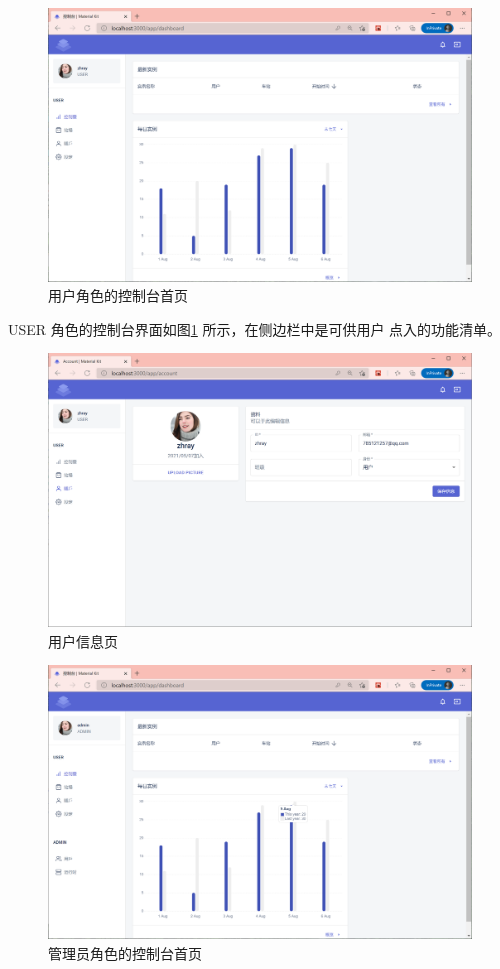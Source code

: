 \begin{figure}[htbp!]
  \centering
  \includegraphics[width=\textwidth]{figures/png/user_ui.png}
  \caption{\label{user_ui}用户角色的控制台首页}
\end{figure}

USER 角色的控制台界面如图\ref{user_ui} 所示，在侧边栏中是可供用户
点入的功能清单。

\begin{figure}[htbp!]
  \centering
  \includegraphics[width=\textwidth]{figures/png/user_data.png}
  \caption{\label{user_data}用户信息页}
\end{figure}

\begin{figure}[htbp!]
  \centering
  \includegraphics[width=\textwidth]{figures/png/admin_ui.png}
  \caption{\label{admin_ui}管理员角色的控制台首页}
\end{figure}

